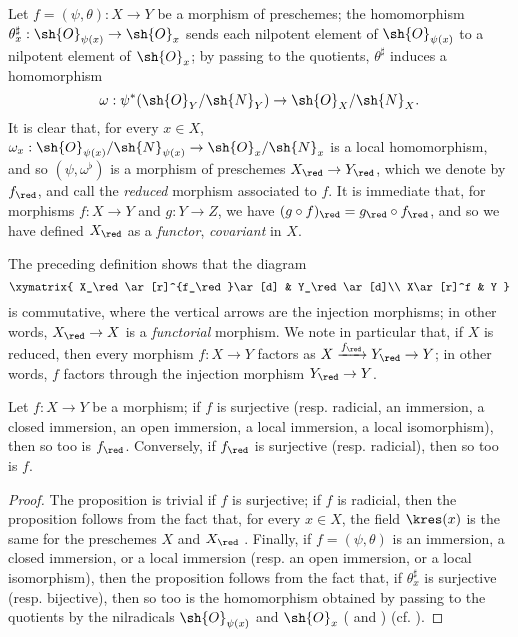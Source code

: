 \begin{env}[5.1.5]
\label{I.5.1.5}
Let $f=(\psi,\theta):X\to Y$ be a morphism of preschemes;
the homomorphism $\theta_x^\sharp:\sh{O}_{\psi(x)}\to\sh{O}_x$ sends each nilpotent element of $\sh{O}_{\psi(x)}$ to a nilpotent element of $\sh{O}_x$;
by passing to the quotients, $\theta^\sharp$ induces a homomorphism
\[
  \omega:\psi^*(\sh{O}_Y/\sh{N}_Y)\to\sh{O}_X/\sh{N}_X.
\]
It is clear that, for every $x\in X$, $\omega_x:\sh{O}_{\psi(x)}/\sh{N}_{\psi(x)}\to\sh{O}_x/\sh{N}_x$ is a local homomorphism, and so $(\psi,\omega^\flat)$ is a morphism of preschemes $X_\red\to Y_\red$, which we denote by $f_\red$, and call the \emph{reduced} morphism associated to $f$.
It is immediate that, for morphisms $f:X\to Y$ and $g:Y\to Z$, we have $(g\circ f)_\red=g_\red\circ f_\red$, and so we have defined $X_\red$ as a \emph{functor}, \emph{covariant} in $X$.

The preceding definition shows that the diagram
\[
  \xymatrix{
    X_\red\ar[r]^{f_\red}\ar[d] &
    Y_\red\ar[d]\\
    X\ar[r]^f &
    Y
  }
\]
is commutative, where the vertical arrows are the injection morphisms;
in other words, $X_\red\to X$ is a \emph{functorial} morphism.
We note in particular that, if $X$ is reduced, then every morphism $f:X\to Y$ factors as $X\xrightarrow{f_\red}Y_\red\to Y$;
in other words, $f$ factors through the injection morphism $Y_\red\to Y$.
\end{env}

\begin{proposition}[5.1.6]
\label{I.5.1.6}
Let $f:X\to Y$ be a morphism;
if $f$ is surjective (resp. radicial, an immersion, a closed immersion, an open immersion, a local immersion, a local isomorphism), then so too is $f_\red$.
Conversely, if $f_\red$ is surjective (resp. radicial), then so too is $f$.
\end{proposition}

\begin{proof}
The proposition is trivial if $f$ is surjective;
if $f$ is radicial, then the proposition follows from the fact that, for every $x\in X$, the field $\kres(x)$ is the same for the preschemes $X$ and $X_\red$ .
Finally, if $f=(\psi,\theta)$ is an immersion, a closed immersion, or a local immersion (resp. an open immersion, or a local isomorphism), then the proposition follows from the fact that, if $\theta_x^\sharp$ is surjective (resp. bijective), then so too is the homomorphism obtained by passing to the quotients by the nilradicals $\sh{O}_{\psi(x)}$ and $\sh{O}_x$ ( and ) (cf. ).
\end{proof}

